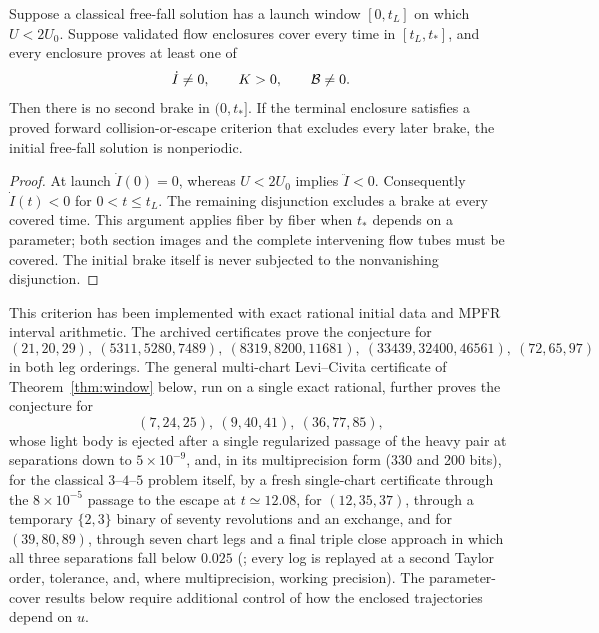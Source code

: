 \begin{corollary}\label{cor:cover}
Suppose a classical free-fall solution has a launch window $[0,t_L]$ on
which $U<2U_0$. Suppose validated flow enclosures cover every time in
$[t_L,t_*]$, and every enclosure proves at least one of
\[
 \dot I\ne0,\qquad K>0,\qquad \mathcal B\ne0.
\]
Then there is no second brake in $(0,t_*]$. If the terminal enclosure
satisfies a proved forward collision-or-escape criterion that excludes every
later brake, the initial free-fall solution is nonperiodic.
\end{corollary}
\begin{proof}
At launch $\dot I(0)=0$, whereas $U<2U_0$ implies $\ddot I<0$.
Consequently $\dot I(t)<0$ for $0<t\le t_L$. The remaining disjunction
excludes a brake at every covered time. This argument applies fiber by fiber
when $t_*$ depends on a parameter; both section images and the complete
intervening flow tubes must be covered. The initial brake itself is never
subjected to the nonvanishing disjunction.
\end{proof}

This criterion has been implemented with exact rational initial data and
MPFR interval arithmetic.  The archived certificates prove the conjecture
for
\[
(21,20,29),\ (5311,5280,7489),\ (8319,8200,11681),
\ (33439,32400,46561),\ (72,65,97)
\]
in both leg orderings. The general multi-chart Levi--Civita certificate of
Theorem~\ref{thm:window} below, run on a single exact rational, further
proves the conjecture for
\[
 (7,24,25),\ (9,40,41),\ (36,77,85),
\]
whose light body is ejected after a single regularized passage of the heavy
pair at separations down to $5\times10^{-9}$, and, in its multiprecision
form (330 and 200 bits), for the classical $3$--$4$--$5$ problem itself, by
a fresh single-chart certificate through the $8\times10^{-5}$ passage to the
escape at $t\simeq12.08$, for $(12,35,37)$, through a temporary
$\{2,3\}$ binary of seventy revolutions and an exchange, and for
$(39,80,89)$, through seven chart legs and a final triple close approach in
which all three separations fall below $0.025$
(; every log is replayed at a second
Taylor order, tolerance, and, where multiprecision, working precision). The
parameter-cover results below require additional control of how the
enclosed trajectories depend on $u$.

